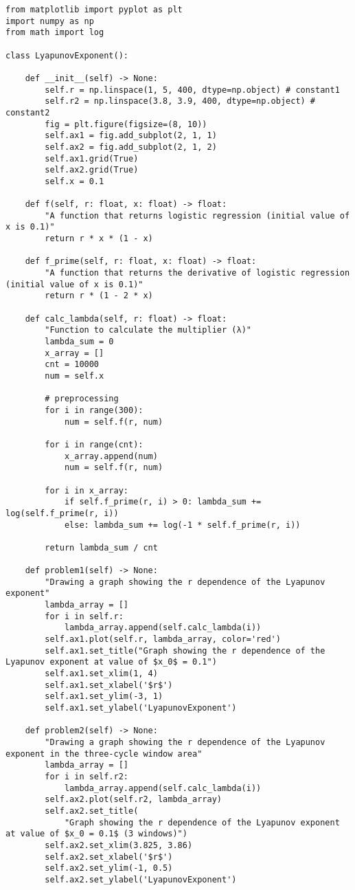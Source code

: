 \documentclass[dvipdfmx,uplatex]{jsarticle}
\begin{document}
\begin{lstlisting}[caption=Pythonによるリアプノフ指数の依存性を示したグラフの描画]
from matplotlib import pyplot as plt
import numpy as np
from math import log

class LyapunovExponent():

    def __init__(self) -> None:
        self.r = np.linspace(1, 5, 400, dtype=np.object) # constant1
        self.r2 = np.linspace(3.8, 3.9, 400, dtype=np.object) # constant2
        fig = plt.figure(figsize=(8, 10))
        self.ax1 = fig.add_subplot(2, 1, 1)
        self.ax2 = fig.add_subplot(2, 1, 2)
        self.ax1.grid(True)
        self.ax2.grid(True)
        self.x = 0.1

    def f(self, r: float, x: float) -> float:
        "A function that returns logistic regression (initial value of x is 0.1)"
        return r * x * (1 - x)

    def f_prime(self, r: float, x: float) -> float:
        "A function that returns the derivative of logistic regression (initial value of x is 0.1)"
        return r * (1 - 2 * x)

    def calc_lambda(self, r: float) -> float:
        "Function to calculate the multiplier (λ)"
        lambda_sum = 0
        x_array = []
        cnt = 10000
        num = self.x

        # preprocessing
        for i in range(300):
            num = self.f(r, num)

        for i in range(cnt):
            x_array.append(num)
            num = self.f(r, num)

        for i in x_array:
            if self.f_prime(r, i) > 0: lambda_sum += log(self.f_prime(r, i))
            else: lambda_sum += log(-1 * self.f_prime(r, i))

        return lambda_sum / cnt

    def problem1(self) -> None:
        "Drawing a graph showing the r dependence of the Lyapunov exponent"
        lambda_array = []
        for i in self.r:
            lambda_array.append(self.calc_lambda(i))
        self.ax1.plot(self.r, lambda_array, color='red')
        self.ax1.set_title("Graph showing the r dependence of the Lyapunov exponent at value of $x_0$ = 0.1")
        self.ax1.set_xlim(1, 4)
        self.ax1.set_xlabel('$r$')
        self.ax1.set_ylim(-3, 1)
        self.ax1.set_ylabel('LyapunovExponent')

    def problem2(self) -> None:
        "Drawing a graph showing the r dependence of the Lyapunov exponent in the three-cycle window area"
        lambda_array = []
        for i in self.r2:
            lambda_array.append(self.calc_lambda(i))
        self.ax2.plot(self.r2, lambda_array)
        self.ax2.set_title(
            "Graph showing the r dependence of the Lyapunov exponent at value of $x_0 = 0.1$ (3 windows)")
        self.ax2.set_xlim(3.825, 3.86)
        self.ax2.set_xlabel('$r$')
        self.ax2.set_ylim(-1, 0.5)
        self.ax2.set_ylabel('LyapunovExponent')


\end{lstlisting}
\end{document}
